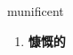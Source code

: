 
\begin{frame}
{\huge munificent}
\begin{center}
\begin{enumerate}\Large
  \item \textbf{慷慨的}
\end{enumerate}
\end{center}
\end{frame}
